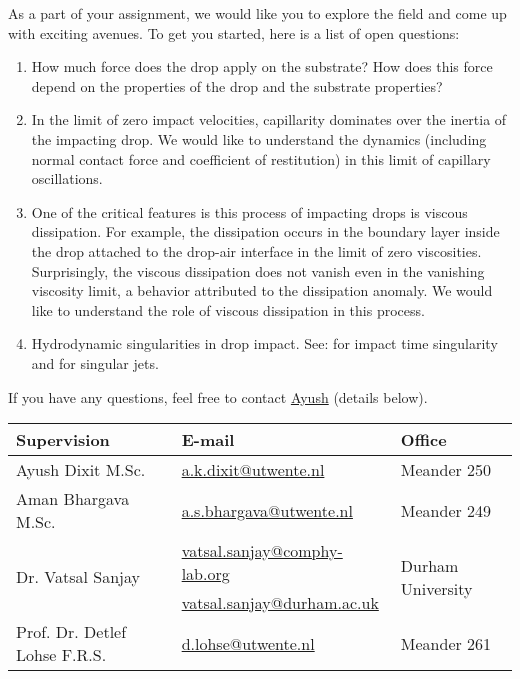 \documentclass[a4paper,10pt]{article}
\begin{document}
As a part of your assignment, we would like you to explore the field and come up with exciting avenues. To get you started, here is a list of open questions:

\begin{enumerate}
 \item How much force does the drop apply on the substrate? How does this force depend on the properties of the drop and the substrate properties?
 \item In the limit of zero impact velocities, capillarity dominates over the inertia of the impacting drop. We would like to understand the dynamics (including normal contact force and coefficient of restitution) in this limit of capillary oscillations. 
 \item One of the critical features is this process of impacting drops is viscous dissipation. For example, the dissipation occurs in the boundary layer inside the drop attached to the drop-air interface in the limit of zero viscosities. Surprisingly, the viscous dissipation does not vanish even in the vanishing viscosity limit, a behavior attributed to the dissipation anomaly. We would like to understand the role of viscous dissipation in this process. 
 \item Hydrodynamic singularities in drop impact. See: \citet{mandre2012mechanism} for impact time singularity and \citet{Bartolo2006Singular, sanjay_lohse_jalaal_2021, zhang2022impact} for singular jets. 
\end{enumerate} 

If you have any questions, feel free to contact \href{mailto:a.k.dixit@utwente.nl}{Ayush} (details below).
\begin{center}
\begin{tabular}{|l|l|l|}
\hline \textbf{Supervision} & \textbf{E-mail} & \textbf{Office} \\
\hline Ayush Dixit M.Sc. & \href{mailto:a.k.dixit@utwente.nl}{a.k.dixit@utwente.nl} & Meander 250 \\
\hline Aman Bhargava M.Sc. & \href{mailto:a.s.bhargava@utwente.nl}{a.s.bhargava@utwente.nl} & Meander 249 \\
\hline \multirow{2}{*}{Dr. Vatsal Sanjay} & \href{mailto:vatsal.sanjay@comphy-lab.org}{vatsal.sanjay@comphy-lab.org} & \multirow{2}{*}{Durham University} \\
& \href{mailto:vatsal.sanjay@durham.ac.uk}{vatsal.sanjay@durham.ac.uk} & \\
\hline Prof. Dr. Detlef Lohse F.R.S. & \href{mailto:d.lohse@utwente.nl}{d.lohse@utwente.nl} & Meander 261  \\
\hline
\end{tabular}
\end{center}

\printbibliography
\end{document}
